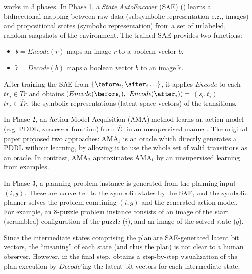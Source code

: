 \latentplanner works in 3 phases.
In Phase 1, a \emph{State AutoEncoder} (SAE) () learns a bidirectional mapping between raw data (subsymbolic representation e.g., images)
 and propositional states (symbolic representation) from a set of unlabeled, random snapshots of the environment.
The trained SAE provides two functions:
\begin{itemize} %
\setlength{\itemsep}{-0.3em}
\item $b=Encode(r)$ maps an image  $r$ to a boolean vector $b$.
\item $\tilde{r}=Decode(b)$ maps a boolean vector $b$ to an image $\tilde{r}$.
\end{itemize}
After training the SAE from $\braces{\before_i, \after_i\ldots}$,
it applies $Encode$ to each $tr_i \in Tr$ and obtains $(Encode(\before_i),$ $Encode(\after_i))=$ $(s_i,t_i)=$ $\overline{tr}_i\in \overline{Tr}$,
the symbolic representations (latent space vectors) of the transitions.

In Phase 2, an Action Model Acquisition (AMA) method learns an action model (e.g. PDDL, successor function) from $\overline{Tr}$ in an unsupervised manner.
The original paper proposed two approaches: AMA$_1$ is an oracle which directly generates a PDDL without learning,
by allowing it to use the whole set of valid transitions as an oracle.
In contrast, AMA$_2$ approximates AMA$_1$ by an unsupervised learning from examples.

In Phase 3, a planning problem instance is generated from the planning input $(i,g)$.
These are converted to the symbolic states by the SAE, and the symbolic planner solves the problem
combining $(i,g)$ and the generated action model.
For example, an 8-puzzle problem instance consists of an image of the start (scrambled) configuration of the puzzle ($i$), and an image of the solved state ($g$).

Since the intermediate states comprising the plan are SAE-generated latent bit vectors, the ``meaning'' of each state (and thus the plan) is not clear to a human observer.
However, in the final step, \latentplanner obtains a step-by-step visualization of the plan execution
by $Decode$'ing the latent bit vectors for each intermediate state.

